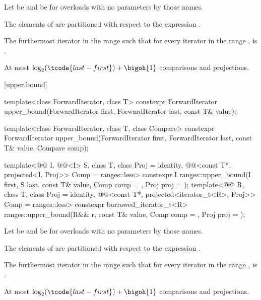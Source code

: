 \begin{itemdescr}
\pnum
Let  be  and
 be 
for overloads with no parameters by those names.

\pnum
\expects
The elements  of 
are partitioned with respect to the expression
.

\pnum
\returns
The furthermost iterator  in the range 
such that for every iterator  in the range ,
 is .

\pnum
\complexity
At most $\log_2(\tcode{last - first}) + \bigoh{1}$ comparisons and projections.
\end{itemdescr}

[upper.bound]{}

%
\begin{itemdecl}
template<class ForwardIterator, class T>
  constexpr ForwardIterator
    upper_bound(ForwardIterator first, ForwardIterator last,
                const T& value);

template<class ForwardIterator, class T, class Compare>
  constexpr ForwardIterator
    upper_bound(ForwardIterator first, ForwardIterator last,
                const T& value, Compare comp);

template<@@ I, @@<I> S, class T, class Proj = identity,
         @@<const T*, projected<I, Proj>> Comp = ranges::less>
  constexpr I ranges::upper_bound(I first, S last, const T& value, Comp comp = {}, Proj proj = {});
template<@@ R, class T, class Proj = identity,
         @@<const T*, projected<iterator_t<R>, Proj>> Comp =
           ranges::less>
  constexpr borrowed_iterator_t<R>
    ranges::upper_bound(R&& r, const T& value, Comp comp = {}, Proj proj = {});
\end{itemdecl}

\begin{itemdescr}
\pnum
Let  be  and
 be 
for overloads with no parameters by those names.

\pnum
\expects
The elements  of 
are partitioned with respect to the expression
.

\pnum
\returns
The furthermost iterator  in the range 
such that for every iterator  in the range ,
 is .

\pnum
\complexity
At most $\log_2(\tcode{last - first}) + \bigoh{1}$ comparisons and projections.
\end{itemdescr}

